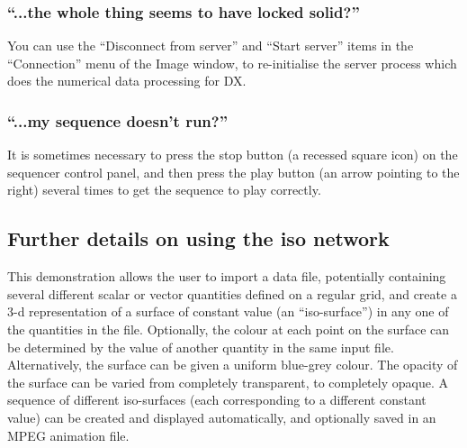 \subsubsection{``...the whole thing seems to have locked solid?''}
You can use the ``Disconnect from server'' and ``Start server'' items in
the ``Connection'' menu of the Image window, to re-initialise the server
process which does the numerical data processing for DX.

\subsubsection{``...my sequence doesn't run?''}
It is sometimes necessary to press the stop button (a recessed square
icon) on the sequencer control panel, and then press the play button (an
arrow pointing to the right) several times to get the sequence to play
correctly.

\subsection{\label{iso}Further details on using the {\bf iso} network}
This demonstration allows the user to import a data file, potentially
containing several different scalar or vector quantities defined on a
regular grid, and create a 3-d representation of a surface of
constant value (an ``iso-surface'') in any one of the quantities in the
file. Optionally, the colour at each point on the surface can be
determined by the value of another quantity in the same input file.
Alternatively, the surface can be given a uniform blue-grey colour. The
opacity of the surface can be varied from completely transparent, to
completely opaque. A sequence of different iso-surfaces (each
corresponding to a different constant value) can be created and displayed
automatically, and optionally saved in an MPEG animation file.

